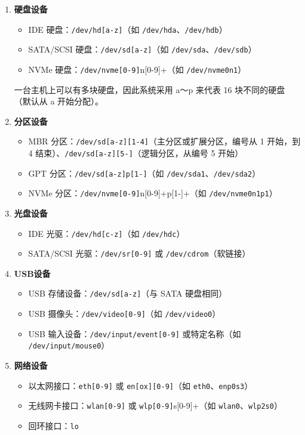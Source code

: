 \documentclass[12pt,UTF8]{ctexbook}
\begin{document}
\begin{enumerate}
    \item \textbf{硬盘设备}
    \begin{itemize}
        \item IDE 硬盘：\verb+/dev/hd[a-z]+（如 \verb+/dev/hda+、\verb+/dev/hdb+）
        \item SATA/SCSI 硬盘：\verb+/dev/sd[a-z]+（如 \verb+/dev/sda+、\verb+/dev/sdb+）
        \item NVMe 硬盘：\verb+/dev/nvme[0-9]+n[0-9]+（如 \verb+/dev/nvme0n1+）
    \end{itemize}
    
    一台主机上可以有多块硬盘，因此系统采用 a～p 来代表 16 块不同的硬盘（默认从 a 开始分配）。

    \item \textbf{分区设备}
    \begin{itemize}
        \item MBR 分区：\verb+/dev/sd[a-z][1-4]+（主分区或扩展分区，编号从 1 开始，到 4 结束）、\verb+/dev/sd[a-z][5-]+（逻辑分区，从编号 5 开始）
        \item GPT 分区：\verb+/dev/sd[a-z]p[1-]+（如 \verb+/dev/sda1+、\verb+/dev/sda2+）
        \item NVMe 分区：\verb+/dev/nvme[0-9]+n[0-9]+p[1-]+（如 \verb+/dev/nvme0n1p1+）
    \end{itemize}

    \item \textbf{光盘设备}
    \begin{itemize}
        \item IDE 光驱：\verb+/dev/hd[c-z]+（如 \verb+/dev/hdc+）
        \item SATA/SCSI 光驱：\verb+/dev/sr[0-9]+ 或 \verb+/dev/cdrom+（软链接）
    \end{itemize}

    \item \textbf{USB设备}
    \begin{itemize}
        \item USB 存储设备：\verb+/dev/sd[a-z]+（与 SATA 硬盘相同）
        \item USB 摄像头：\verb+/dev/video[0-9]+（如 \verb+/dev/video0+）
        \item USB 输入设备：\verb+/dev/input/event[0-9]+ 或特定名称（如 \verb+/dev/input/mouse0+）
    \end{itemize}

    \item \textbf{网络设备}
    \begin{itemize}
        \item 以太网接口：\verb+eth[0-9]+ 或 \verb+en[ox][0-9]+（如 \verb+eth0+、\verb+enp0s3+）
        \item 无线网卡接口：\verb+wlan[0-9]+ 或 \verb+wlp[0-9]+s[0-9]+（如 \verb+wlan0+、\verb+wlp2s0+）
        \item 回环接口：\verb+lo+
    \end{itemize}


\end{enumerate}
\end{document}
